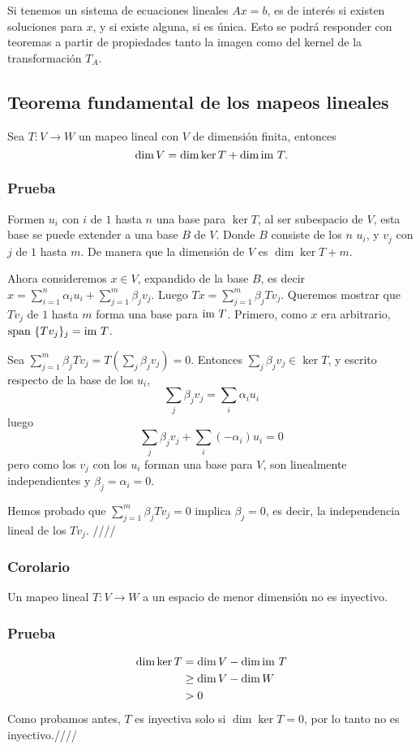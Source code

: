 \documentclass{article}
\begin{document}
Si tenemos un sistema de ecuaciones lineales $Ax=b$, es de
interés si existen soluciones para $x$, y si existe alguna,
si es única. Esto se podrá responder con teoremas a partir de propiedades tanto la imagen como del kernel de la transformación $T_A$.

\subsection{Teorema fundamental de los mapeos lineales}
Sea $T: V\rightarrow W$ un mapeo lineal con $V$ de dimensión finita,
entonces
$$\dim V = \dim\ker T + \dim\text{im } T.$$

\subsubsection*{Prueba}
Formen $u_i$ con $i$ de $1$ hasta $n$ una base para $\ker T$,
al ser subespacio de $V$, esta base se puede extender a una base $B$
de $V$. Donde $B$ consiste de los $n$ $u_i$, y
$v_j$ con $j$ de $1$ hasta $m$. De manera que la dimensión de $V$
es $\dim\ker T+m$.

Ahora consideremos $x\in V$, expandido de la base $B$, es decir\\
$x= \sum^n_{i=1}\alpha_iu_i + \sum^m_{j=1}\beta_jv_j$. Luego
$Tx = \sum^m_{j=1}\beta_jTv_j$. Queremos mostrar que $Tv_j$ de
$1$ hasta $m$ forma una base para $\text{im } T$. Primero, como $x$ era arbitrario, $\text{span } \{Tv_j\}_j = \text{im } T$.

Sea $\sum^m_{j=1}\beta_jTv_j = T(\sum_j\beta_jv_j)=0$.
Entonces $\sum_j\beta_jv_j \in \ker T$, y escrito respecto de la base
de los $u_i$,
$$\sum_j\beta_jv_j = \sum_i\alpha_iu_i$$
luego
$$\sum_j\beta_jv_j + \sum_i(-\alpha_i)u_i = 0$$
pero como los $v_j$ con los $u_i$ forman una base para $V$,
son linealmente independientes y $\beta_j=\alpha_i=0$.

Hemos probado que $\sum^m_{j=1}\beta_jTv_j = 0$ implica
$\beta_j = 0$, es decir, la independencia lineal de los $Tv_j$.
\hfill ////

\subsubsection{Corolario}
Un mapeo lineal $T:V\rightarrow W$ a un espacio de menor dimensión no es inyectivo.
\subsubsection*{Prueba}
\begin{align*}
\dim\ker T &= \dim V - \dim\text{im } T\\
    &\geq \dim V - \dim W\\
    &> 0
\end{align*}
Como probamos antes, $T$ es inyectiva solo si $\dim \ker T = 0$,
por lo tanto no es inyectivo.\hfill ////
\end{document}
